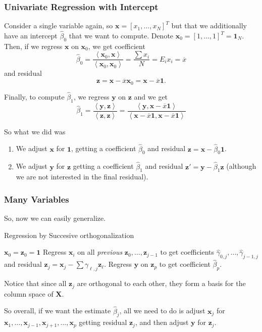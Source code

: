 \documentclass[11pt]{article}
\theoremstyle{definition}
\newcommand{\XX}{\mathbf{X}}
\newcommand{\xx}{\mathbf{x}}
\newcommand{\zz}{\mathbf{z}}
\newcommand{\yy}{\mathbf{y}}
\newcommand{\onevec}{\mathbf{1}}
\newcommand{\ip}[2]{\ensuremath{\left\langle#1, #2\right\rangle}}
\begin{document}
\subsubsection{Univariate Regression with Intercept}
Consider a single variable again, so $\xx=[x_1,\ldots,x_N]^T$ but that we
additionally have an intercept $\hat\beta_0$ that we want to compute. Denote
$\xx_0=[1,\ldots,1]^T=\onevec_N$. Then, if we regress $\xx$ on $\xx_0$, we get
coefficient
\[\hat\beta_0=\frac{\ip{\xx_0}\xx}{\ip{\xx_0}{\xx_0}}=\frac{\sum x_i}{N}=E_ix_i=\overline{x}\]
and residual
\[\zz=\xx-\overline{x}\xx_0=\xx-\overline{x}\onevec.\]

Finally, to compute $\hat\beta_1$, we regress $\yy$ on $\zz$ and we get
\[\hat\beta_1=\frac{\ip\yy\zz}{\ip\zz\zz}=\frac{\ip\yy{\xx-\overline{x}\onevec}}{\ip{\xx-\overline{x}\onevec}{\xx-\overline{x}\onevec}}\]

So what we did was
\begin{enumerate}
	\item We adjust $\xx$ for $\onevec$, getting a coefficient $\hat\beta_0$ and
	      residual $\zz=\xx-\hat\beta_0\onevec$.
	\item We adjust $\yy$ for $\zz$ getting a coefficient $\hat\beta_1$ and
	      residual $\zz'=\yy-\hat\beta_1\zz$ (although we are not interested in the
	      final residual).
\end{enumerate}

\subsubsection{Many Variables}
So, now we can easily generalize.
\begin{algorithm}
	\caption{Regression by Succesive orthogonalization}\label{alg:Gram-Schmidt}
	\begin{algorithmic}
		\State $\xx_0=\zz_0=\onevec$
		\State Regress $\xx_i$ on all \emph{previous} $\zz_0,\ldots,\zz_{j-1}$ 
		to get coefficients $\hat\gamma_{0,j},\ldots,\hat\gamma_{j-1,j}$ and
		residual $\zz_j=\xx_j-\sum \gamma_{\ell,j}\zz_\ell$.
		\EndFor
		\State Regress $\yy$ on $\zz_p$ to get coefficient $\hat\beta_p$.
	\end{algorithmic}
\end{algorithm}

Notice that since all $\zz_j$ are orthogonal to each other, they form a basis
for the column space of $\XX$.

So overall, if we want the estimate $\hat\beta_j$, all we need to do is adjust
$\xx_j$ for $\xx_1,\ldots,\xx_{j-1},\xx_{j+1},\ldots,\xx_p$ getting residual
$\zz_j$, and then adjust $\yy$ for $\zz_j$.
\end{document}
